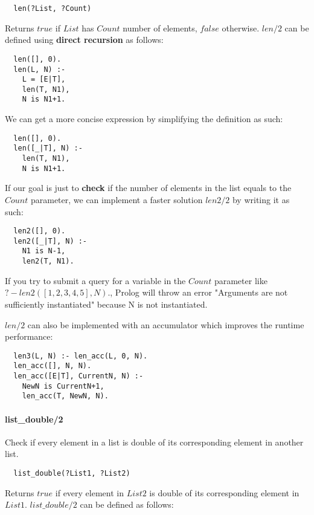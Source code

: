 \documentclass{article}
\begin{document}
\begin{multicols}{2}
  \begin{lstlisting}
  len(?List, ?Count)
  \end{lstlisting} 
  
  Returns $true$ if $List$ has $Count$ number of elements, $false$ otherwise. $len/2$ can be defined using {\bf direct recursion} as follows:
  
  \begin{lstlisting}
  len([], 0).
  len(L, N) :-
	L = [E|T],
	len(T, N1),
	N is N1+1.
  \end{lstlisting} 
  
  We can get a more concise expression by simplifying the definition as such:  
  
  \begin{lstlisting}
  len([], 0).
  len([_|T], N) :-
	len(T, N1),
	N is N1+1.
  \end{lstlisting} 

  If our goal is just to {\bf check} if the number of elements in the list equals to the $Count$ parameter, we can implement a faster solution $len2/2$ by writing it as such:
  
  \begin{lstlisting} 
  len2([], 0).
  len2([_|T], N) :-
    N1 is N-1,
  	len2(T, N1).
  \end{lstlisting}
  
  If you try to submit a query for a variable in the $Count$ parameter like $?- len2([1, 2, 3, 4, 5], N).$, Prolog will throw an error "Arguments are not sufficiently instantiated" because N is not instantiated.
  
  $len/2$ can also be implemented with an accumulator which improves the runtime performance:
  
  \begin{lstlisting} 
  len3(L, N) :- len_acc(L, 0, N).
  len_acc([], N, N).
  len_acc([E|T], CurrentN, N) :-
	NewN is CurrentN+1,
	len_acc(T, NewN, N).
  \end{lstlisting}  
  
  \paragraph{list\_double/2} Check if every element in a list is double of its corresponding element in another list.
  
  \begin{lstlisting}
  list_double(?List1, ?List2)
  \end{lstlisting} 
  
  Returns $true$ if every element in $List2$ is double of its corresponding element in $List1$. $list\_double/2$ can be defined as follows:


\end{multicols}
\end{document}
